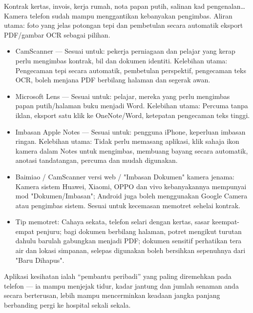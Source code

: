 
Kontrak kertas, invois, kerja rumah, nota papan putih, salinan kad pengenalan… Kamera telefon sudah mampu menggantikan kebanyakan pengimbas. Aliran utama: foto yang jelas potongan tepi dan pembetulan secara automatik eksport PDF/gambar OCR sebagai pilihan.

\begin{itemize}
  \item CamScanner — Sesuai untuk: pekerja perniagaan dan pelajar yang kerap perlu mengimbas kontrak, bil dan dokumen identiti. Kelebihan utama: Pengecaman tepi secara automatik, pembetulan perspektif, pengecaman teks OCR, boleh menjana PDF berbilang halaman dan segerak awan.
  \item Microsoft Lens — Sesuai untuk: pelajar, mereka yang perlu mengimbas papan putih/halaman buku menjadi Word. Kelebihan utama: Percuma tanpa iklan, eksport satu klik ke OneNote/Word, ketepatan pengecaman teks tinggi.
  \item Imbasan Apple Notes — Sesuai untuk: pengguna iPhone, keperluan imbasan ringan. Kelebihan utama: Tidak perlu memasang aplikasi, klik sahaja ikon kamera dalam Notes untuk mengimbas, membuang bayang secara automatik, anotasi tandatangan, percuma dan mudah digunakan.
  \item Baimiao / CamScanner versi web / "Imbasan Dokumen" kamera jenama: Kamera sistem Huawei, Xiaomi, OPPO dan vivo kebanyakannya mempunyai mod "Dokumen/Imbasan"; Android juga boleh menggunakan Google Camera atau pengimbas sistem. Sesuai untuk kecemasan memotret sehelai kontrak.
  \item Tip memotret: Cahaya sekata, telefon selari dengan kertas, sasar keempat-empat penjuru; bagi dokumen berbilang halaman, potret mengikut turutan dahulu barulah gabungkan menjadi PDF; dokumen sensitif perhatikan tera air dan lokasi simpanan, selepas digunakan boleh bersihkan sepenuhnya dari "Baru Dihapus".
\end{itemize}


Aplikasi kesihatan ialah “pembantu peribadi” yang paling diremehkan pada telefon — ia mampu menjejak tidur, kadar jantung dan jumlah senaman anda secara berterusan, lebih mampu mencerminkan keadaan jangka panjang berbanding pergi ke hospital sekali sekala.


